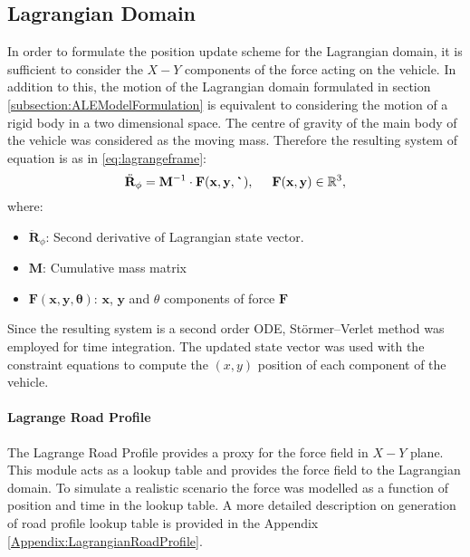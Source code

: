 \subsection{Lagrangian Domain} \label{subsection:lagrange}
In order to formulate the position update scheme for the Lagrangian domain, it is sufficient to consider the $X-Y$ components of the force acting on the vehicle. In addition to this, the motion of the Lagrangian domain formulated in section \ref{subsection:ALEModelFormulation} is equivalent to considering the motion of a rigid body in a two dimensional space. The centre of gravity of the main body of the vehicle was considered as the moving mass. Therefore the resulting system of equation is as in \eqref{eq:lagrangeframe}:
\begin{equation}
    \label{eq:lagrangeframe}
   \ddot{\mathbf{R}}_{\phi} = \mathbf{M}^{-1} \cdot \mathbf{F(x,y, \theta)}, \hspace{0.5 cm} \mathbf{F(x,y)} \in \mathbb{R}^{3},
\end{equation}
where: 
\begin{itemize}
    \item $\ddot{\mathbf{R}}_{\phi}$: Second derivative of Lagrangian state vector.
    \item $\mathbf{M}$: Cumulative mass matrix
    \item $\mathbf{F(x,y, \theta)}$: $\mathbf{x}$, $\mathbf{y}$ and $\theta$ components of force $\mathbf{F}$
\end{itemize}

\noindent Since the resulting system is a second order ODE, Störmer–Verlet method \cite{verlet} was employed for time integration. The updated state vector was used with the constraint equations to compute the $(x, y)$ position of each component of the vehicle.

\paragraph{Lagrange Road Profile}\label{par:lagrangeprofile}
The Lagrange Road Profile provides a proxy for the force field in $X-Y$ plane. This module acts as a lookup table and provides the force field to the Lagrangian domain. To simulate a realistic scenario the force was modelled as a function of position and time in the lookup table. A more detailed description on generation of road profile lookup table is provided in the Appendix \ref{Appendix:LagrangianRoadProfile}.

